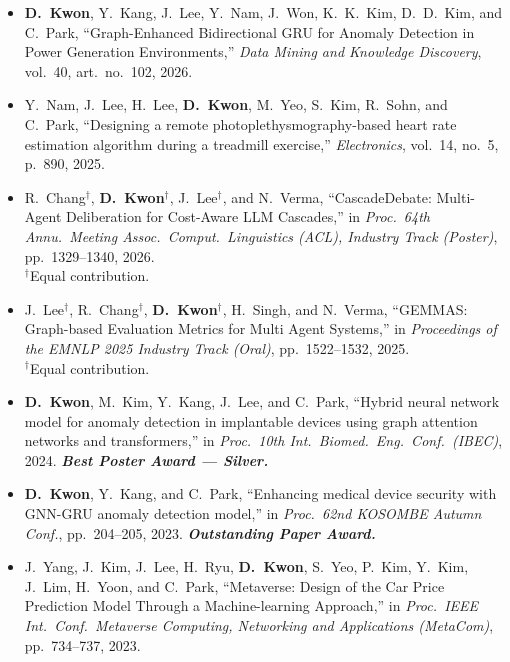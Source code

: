 \documentclass[11pt, letterpaper]{awesome-cv}
\begin{document}

{\footnotesize
\begin{itemize}[leftmargin=*, topsep=2pt, itemsep=2pt]
  \item \textbf{D.~Kwon}, Y.~Kang, J.~Lee, Y.~Nam, J.~Won, K.~K.~Kim, D.~D.~Kim, and C.~Park, ``Graph-Enhanced Bidirectional GRU for Anomaly Detection in Power Generation Environments,'' \emph{Data Mining and Knowledge Discovery}, vol.~40, art.~no.~102, 2026.
  \item Y.~Nam, J.~Lee, H.~Lee, \textbf{D.~Kwon}, M.~Yeo, S.~Kim, R.~Sohn, and C.~Park, ``Designing a remote photoplethysmography-based heart rate estimation algorithm during a treadmill exercise,'' \emph{Electronics}, vol.~14, no.~5, p.~890, 2025.
\end{itemize}
}

{\footnotesize
\begin{itemize}[leftmargin=*, topsep=2pt, itemsep=2pt]
  \item R.~Chang$^{\dagger}$, \textbf{D.~Kwon}$^{\dagger}$, J.~Lee$^{\dagger}$, and N.~Verma, ``CascadeDebate: Multi-Agent Deliberation for Cost-Aware LLM Cascades,'' in \emph{Proc.~64th Annu.\ Meeting Assoc.\ Comput.\ Linguistics (ACL), Industry Track (Poster)}, pp.~1329--1340, 2026.\\$^{\dagger}$Equal contribution.  \item J.~Lee$^{\dagger}$, R.~Chang$^{\dagger}$, \textbf{D.~Kwon}$^{\dagger}$, H.~Singh, and N.~Verma, ``GEMMAS: Graph-based Evaluation Metrics for Multi Agent Systems,'' in \emph{Proceedings of the EMNLP 2025 Industry Track (Oral)}, pp.~1522--1532, 2025.\\$^{\dagger}$Equal contribution.  \item \textbf{D.~Kwon}, M.~Kim, Y.~Kang, J.~Lee, and C.~Park, ``Hybrid neural network model for anomaly detection in implantable devices using graph attention networks and transformers,'' in \emph{Proc.\ 10th Int.\ Biomed.\ Eng.\ Conf.\ (IBEC)}, 2024. \textbf{\emph{Best Poster Award --- Silver.}}  \item \textbf{D.~Kwon}, Y.~Kang, and C.~Park, ``Enhancing medical device security with GNN-GRU anomaly detection model,'' in \emph{Proc.\ 62nd KOSOMBE Autumn Conf.}, pp.~204--205, 2023. \textbf{\emph{Outstanding Paper Award.}}  \item J.~Yang, J.~Kim, J.~Lee, H.~Ryu, \textbf{D.~Kwon}, S.~Yeo, P.~Kim, Y.~Kim, J.~Lim, H.~Yoon, and C.~Park, ``Metaverse: Design of the Car Price Prediction Model Through a Machine-learning Approach,'' in \emph{Proc.\ IEEE Int.\ Conf.\ Metaverse Computing, Networking and Applications (MetaCom)}, pp.~734--737, 2023.\end{itemize}
}
\end{document}

